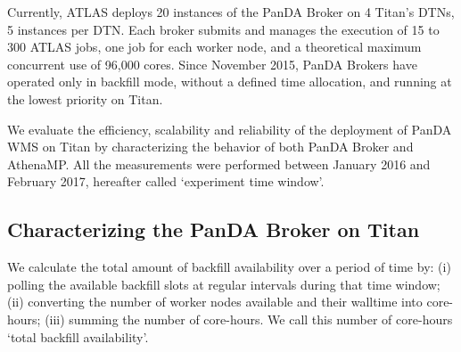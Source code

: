 Currently, ATLAS deploys 20 instances of the PanDA Broker on 4 Titan's DTNs, 5
instances per DTN. Each broker submits and manages the execution of 15 to 300
ATLAS jobs, one job for each worker node, and a theoretical maximum concurrent
use of 96,000 cores. Since November 2015, PanDA Brokers have operated only in
backfill mode, without a defined time allocation, and running at the lowest
priority on Titan.

We evaluate the efficiency, scalability and reliability of the deployment of
PanDA WMS on Titan by characterizing the behavior of both PanDA Broker and
AthenaMP. All the measurements were performed between January 2016 and February
2017, hereafter called `experiment time window'.




\subsection{Characterizing the PanDA Broker on Titan}
\label{ssec:broker_titan}


We calculate the total amount of backfill availability over a period of time by:
(i) polling the available backfill slots at regular intervals during that time
window; (ii) converting the number of worker nodes available and their walltime
into core-hours; (iii) summing the number of core-hours. We call this number of
core-hours `total backfill availability'.

